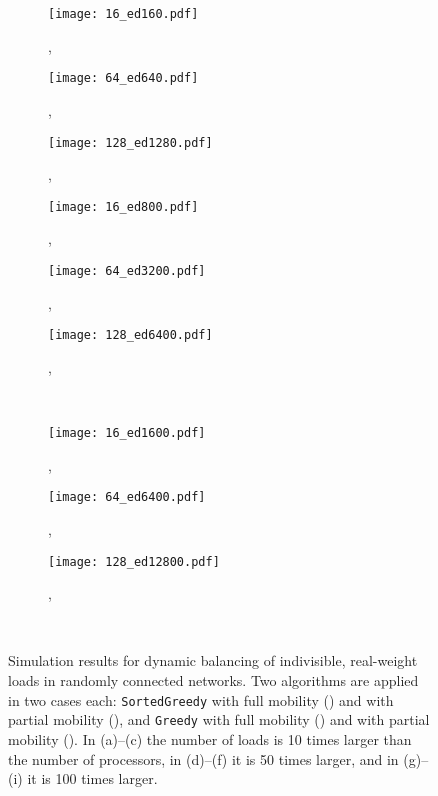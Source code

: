 \documentclass[12pt,psfig,a4]{article}
\newcommand{\sg}{\texttt{SortedGreedy}}
\newcommand{\gr}{\texttt{Greedy}}
\theoremstyle{plain}
\begin{document}
\begin{figure}
\centering	
	\begin{subfigure}[b]{0.32\textwidth}
		\centering
	      	\texttt{[image: 16\_ed160.pdf]}
		\caption{, }
		\label{fig:16_d160}
	\end{subfigure}
\begin{subfigure}[b]{0.32\textwidth}
		\centering
	      	\texttt{[image: 64\_ed640.pdf]}
		\caption{, }
		\label{fig:64_d640}
	\end{subfigure}
	\begin{subfigure}[b]{0.32\textwidth}
		\centering
	      	\texttt{[image: 128\_ed1280.pdf]}
		\caption{, }
		\label{fig:128_d1280}
	\end{subfigure}
 	
	\begin{subfigure}[b]{0.32\textwidth}
		\centering
	      	\texttt{[image: 16\_ed800.pdf]}
		\caption{, }
		\label{fig:16_d800}
	\end{subfigure}
\begin{subfigure}[b]{0.32\textwidth}
		\centering
	      	\texttt{[image: 64\_ed3200.pdf]}
		\caption{, }
		\label{fig:64_d3200}
	\end{subfigure}
	\begin{subfigure}[b]{0.32\textwidth}
		\centering
	      	\texttt{[image: 128\_ed6400.pdf]}
		\caption{, }
		\label{fig:128_d6400}
	\end{subfigure}
	\\
	\begin{subfigure}[b]{0.32\textwidth}
		\centering
	      	\texttt{[image: 16\_ed1600.pdf]}
		\caption{, }
		\label{fig:16_d1600}
	\end{subfigure}
\begin{subfigure}[b]{0.32\textwidth}
		\centering
	      	\texttt{[image: 64\_ed6400.pdf]}
		\caption{, }
		\label{fig:64_d6400}
	\end{subfigure}
	\begin{subfigure}[b]{0.32\textwidth}
		\centering
	      	\texttt{[image: 128\_ed12800.pdf]}
		\caption{, }
		\label{fig:128_d12800}
	\end{subfigure}
	\\

	\caption{Simulation results for dynamic balancing of indivisible, real-weight loads in randomly connected networks. Two algorithms are applied in two cases each: \sg{} with full mobility () and with partial mobility (), and \gr{} with full mobility () and with partial mobility  (). In (a)--(c) the number of loads is 10 times larger than the number of processors, in (d)--(f) it is 50 times larger, and in (g)--(i) it is 100 times larger.}
	\label{fig:random_con}
\end{figure}
\end{document}
